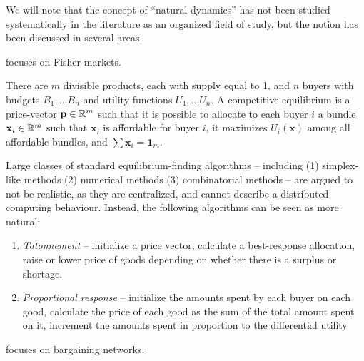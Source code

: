 \documentclass{article}
\begin{document}
We will note that the concept of ``natural dynamics'' has not been studied systematically in the literature as an organized field of study, but the notion has been discussed in several areas.

\cite{cheung} focuses on Fisher markets. 

\begin{definition}\label{def:fisher}
    There are $m$ divisible products, each with supply equal to 1, and $n$ buyers with budgets $B_1,\dots B_n$ and utility functions $U_1,\dots U_n$. A competitive equilibrium is a  price-vector $\mathbf{p}\in\mathbb{R}^m$ such that it is possible to allocate to each buyer $i$ a bundle $\mathbf{x}_i\in\mathbb{R}^m$ such that $\mathbf{x}_i$ is affordable for buyer $i$, it maximizes $U_i(\mathbf{x})$ among all affordable bundles, and $\sum \mathbf{x}_i=\mathbf{1}_m$.
\end{definition}

Large classes of standard equilibrium-finding algorithms -- including (1) simplex-like methods (2) numerical methods (3) combinatorial methods -- are argued to not be realistic, as they are centralized, and cannot describe a distributed computing behaviour. Instead, the following algorithms can be seen as more natural:

\begin{enumerate}
    \item \emph{Tatonnement} -- initialize a price vector, calculate a best-response allocation, raise or lower price of goods depending on whether there is a surplus or shortage.
    \item \emph{Proportional response} -- initialize the amounts spent by each buyer on each good, calculate the price of each good as the sum of the total amount spent on it, increment the amounts spent in proportion to the differential utility. 
\end{enumerate}

\cite{bayati3} focuses on bargaining networks. 
\end{document}
